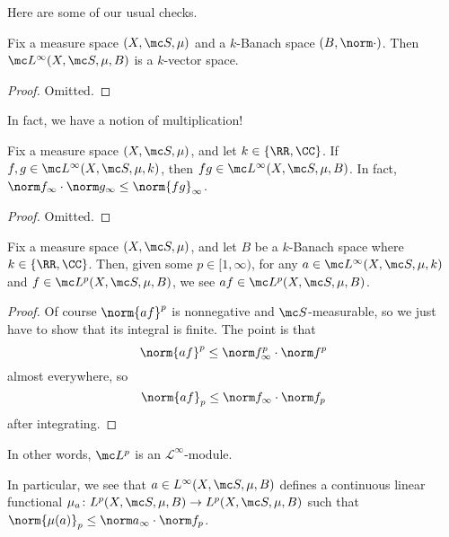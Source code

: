\documentclass[../notes.tex]{subfiles}
\begin{document}
Here are some of our usual checks.
\begin{lemma}
	Fix a measure space $(X,\mc S,\mu)$ and a $k$-Banach space $(B,\norm\cdot)$. Then $\mc L^\infty(X,\mc S,\mu,B)$ is a $k$-vector space.
\end{lemma}
\begin{proof}
	Omitted.
\end{proof}
In fact, we have a notion of multiplication!
\begin{lemma}
	Fix a measure space $(X,\mc S,\mu)$, and let $k\in\{\RR,\CC\}$. If $f,g\in\mc L^\infty(X,\mc S,\mu,k)$, then $fg\in\mc L^\infty(X,\mc S,\mu,B)$. In fact, $\norm f_\infty\cdot\norm g_\infty\le\norm{fg}_\infty$.
\end{lemma}
\begin{proof}
	Omitted.
\end{proof}
\begin{lemma}
	Fix a measure space $(X,\mc S,\mu)$, and let $B$ be a $k$-Banach space where $k\in\{\RR,\CC\}$. Then, given some $p\in[1,\infty)$, for any $a\in\mc L^\infty(X,\mc S,\mu,k)$ and $f\in\mc L^p(X,\mc S,\mu,B)$, we see $af\in\mc L^p(X,\mc S,\mu,B)$.
\end{lemma}
\begin{proof}
	Of course $\norm{af}^p$ is nonnegative and $\mc S$-measurable, so we just have to show that its integral is finite. The point is that
	\[\norm{af}^p\le\norm f_\infty^p\cdot\norm f^p\]
	almost everywhere, so
	\[\norm{af}_p\le\norm f_\infty\cdot\norm f_p\]
	after integrating.
\end{proof}
In other words, $\mc L^p$ is an $\mathcal L^\infty$-module.
\begin{example} \label{ex:first-bounded-functional}
	In particular, we see that $a\in L^\infty(X,\mc S,\mu,B)$ defines a continuous linear functional $\mu_a\colon L^p(X,\mc S,\mu,B)\to L^p(X,\mc S,\mu,B)$ such that $\norm{\mu(a)}_p\le\norm a_\infty\cdot\norm f_p$.
\end{example}
\end{document}
